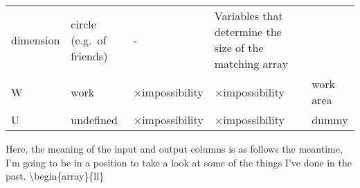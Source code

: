 \begin{longtable}[]{@{}lllll@{}}
\begin{minipage}[t]{0.17\columnwidth}
dimension\strut
\end{minipage} & \begin{minipage}[t]{0.17\columnwidth}\raggedright
circle (e.g.~of friends)\strut
\end{minipage} & \begin{minipage}[t]{0.17\columnwidth}\raggedright
-\strut
\end{minipage} & \begin{minipage}[t]{0.17\columnwidth}\raggedright
Variables that determine the size of the matching array\strut
\end{minipage}\tabularnewline
\begin{minipage}[t]{0.17\columnwidth}\raggedright
W\strut
\end{minipage} & \begin{minipage}[t]{0.17\columnwidth}\raggedright
work\strut
\end{minipage} & \begin{minipage}[t]{0.17\columnwidth}\raggedright
×impossibility\strut
\end{minipage} & \begin{minipage}[t]{0.17\columnwidth}\raggedright
×impossibility\strut
\end{minipage} & \begin{minipage}[t]{0.17\columnwidth}\raggedright
work area\strut
\end{minipage}\tabularnewline
\begin{minipage}[t]{0.17\columnwidth}\raggedright
U\strut
\end{minipage} & \begin{minipage}[t]{0.17\columnwidth}\raggedright
undefined\strut
\end{minipage} & \begin{minipage}[t]{0.17\columnwidth}\raggedright
×impossibility\strut
\end{minipage} & \begin{minipage}[t]{0.17\columnwidth}\raggedright
×impossibility\strut
\end{minipage} & \begin{minipage}[t]{0.17\columnwidth}\raggedright
dummy\strut
\end{minipage}\tabularnewline
\bottomrule
\end{longtable}

Here, the meaning of the input and output columns is as follows \In the
meantime, I'm going to be in a position to take a look at some of the
things I've done in the past. \textbackslash begin\{array\}\{ll\}

